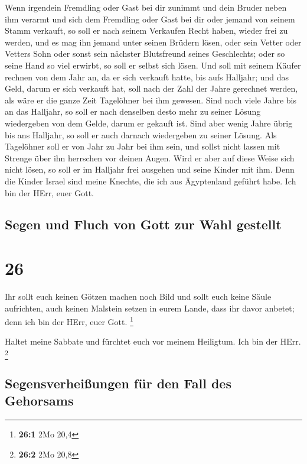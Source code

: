  Wenn irgendein Fremdling oder Gast bei dir zunimmt und
dein Bruder neben ihm verarmt und sich dem Fremdling oder Gast bei dir
oder jemand von seinem Stamm verkauft,  so soll er nach
seinem Verkaufen Recht haben, wieder frei zu werden, und es mag ihn
jemand unter seinen Brüdern lösen,  oder sein Vetter oder
Vetters Sohn oder sonst sein nächster Blutsfreund seines Geschlechts;
oder so seine Hand so viel erwirbt, so soll er selbst sich lösen.
 Und soll mit seinem Käufer rechnen von dem Jahr an, da
er sich verkauft hatte, bis aufs Halljahr; und das Geld, darum er sich
verkauft hat, soll nach der Zahl der Jahre gerechnet werden, als wäre er
die ganze Zeit Tagelöhner bei ihm gewesen.  Sind noch
viele Jahre bis an das Halljahr, so soll er nach denselben desto mehr zu
seiner Lösung wiedergeben von dem Gelde, darum er gekauft ist.
 Sind aber wenig Jahre übrig bis ans Halljahr, so soll er
auch darnach wiedergeben zu seiner Lösung.  Als
Tagelöhner soll er von Jahr zu Jahr bei ihm sein, und sollst nicht
lassen mit Strenge über ihn herrschen vor deinen Augen. 
Wird er aber auf diese Weise sich nicht lösen, so soll er im Halljahr
frei ausgehen und seine Kinder mit ihm.  Denn die Kinder
Israel sind meine Knechte, die ich aus Ägyptenland geführt habe. Ich bin
der HErr, euer Gott.

\hypertarget{segen-und-fluch-von-gott-zur-wahl-gestellt}{%
\subsection{Segen und Fluch von Gott zur Wahl
gestellt}\label{segen-und-fluch-von-gott-zur-wahl-gestellt}}

\hypertarget{section-25}{%
\section{26}\label{section-25}}

 Ihr sollt euch keinen Götzen machen noch Bild und sollt
euch keine Säule aufrichten, auch keinen Malstein setzen in eurem Lande,
dass ihr davor anbetet; denn ich bin der HErr, euer Gott. \footnote{\textbf{26:1}
  2Mo 20,4}

 Haltet meine Sabbate und fürchtet euch vor meinem
Heiligtum. Ich bin der HErr. \footnote{\textbf{26:2} 2Mo 20,8}

\hypertarget{segensverheiuxdfungen-fuxfcr-den-fall-des-gehorsams}{%
\subsection{Segensverheißungen für den Fall des
Gehorsams}\label{segensverheiuxdfungen-fuxfcr-den-fall-des-gehorsams}}

